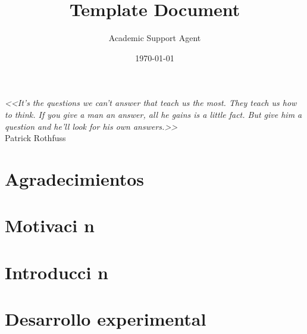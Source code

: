 \documentclass{article}
\title{Template Document}
\author{Academic Support Agent}
\date{\today}
\begin{document}
\maketitle


\maketitle %

\chapter*{}
\begin{flushright}
	{%
	\selectfont\emph{<<It's the questions we can't answer that teach us the most. They teach us how to think. If you give a man an answer, all he gains is a little fact. But give him a question and he'll look for his own answers.>>}\\
\vspace{5mm}
	Patrick Rothfuss}

\end{flushright}
\vfill
\chapter{Agradecimientos}
\lipsum[6-9]




\chapter{Motivaci n}


\chapter{Introducci n}


\chapter{Desarrollo experimental}

\end{document}
